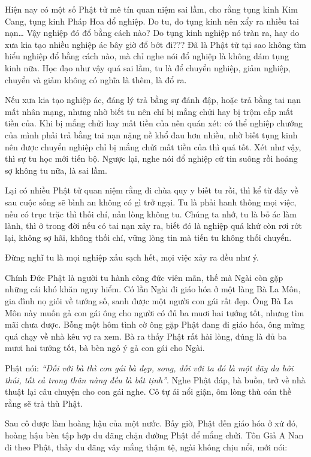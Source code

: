 \documentclass[
  12pt,
  oneside]{book}
\begin{document}
Hiện nay có một số Phật tử mê tín quan niệm sai lầm, cho rằng tụng kinh Kim Cang, tụng kinh Pháp Hoa đổ nghiệp. Do tu, do tụng kinh nên xẩy ra nhiều tai nạn\ldots{} Vậy nghiệp đó đổ bằng cách nào? Do tụng kinh nghiệp nó tràn ra, hay do xưa kia tạo nhiều nghiệp ác bây giờ đổ bớt đi??? Đã là Phật tử tại sao không tìm hiểu nghiệp đổ bằng cách nào, mà chỉ nghe nói đổ nghiệp là không dám tụng kinh nữa. Học đạo như vậy quá sai lầm, tu là để chuyển nghiệp, giảm nghiệp, chuyển và giảm không có nghĩa là thêm, là đổ ra.

Nếu xưa kia tạo nghiệp ác, đáng lý trả bằng sự đánh đập, hoặc trả bằng tai nạn mất nhân mạng, nhưng nhờ biết tu nên chỉ bị mắng chửi hay bị trộm cắp mất tiền của. Khi bị mắng chửi hay mất tiền của nên quán xét: có thể nghiệp chướng của mình phải trả bằng tai nạn nặng nề khổ đau hơn nhiều, nhờ biết tụng kinh nên được chuyển nghiệp chỉ bị mắng chửi mất tiền của thì quá tốt. Xét như vậy, thì sự tu học mới tiến bộ. Ngược lại, nghe nói đổ nghiệp cứ tin suông rồi hoảng sợ không tu nữa, là sai lầm.

Lại có nhiều Phật tử quan niệm rằng đi chùa quy y biết tu rồi, thì kể từ đây về sau cuộc sống sẽ bình an không có gì trở ngại. Tu là phải hanh thông mọi việc, nếu có trục trặc thì thối chí, nản lòng không tu. Chúng ta nhớ, tu là bỏ ác làm lành, thì ở trong đời nếu có tai nạn xảy ra, biết đó là nghiệp quá khứ còn rơi rớt lại, không sợ hãi, không thối chí, vững lòng tin mà tiến tu không thối chuyển.

Đừng nghĩ tu là mọi nghiệp xấu sạch hết, mọi việc xảy ra đều như ý.

Chính Đức Phật là người tu hành công đức viên mãn, thế mà Ngài còn gặp những cái khó khăn nguy hiểm. Có lần Ngài đi giáo hóa ở một làng Bà La Môn, gia đình nọ giỏi về tướng số, sanh được một người con gái rất đẹp. Ông Bà La Môn này muốn gả con gái ông cho người có đủ ba muơi hai tướng tốt, nhưng tìm mãi chưa được. Bỗng một hôm tình cờ ông gặp Phật đang đi giáo hóa, ông mừng quá chạy về nhà kêu vợ ra xem. Bà ra thấy Phật rất hài lòng, đúng là đủ ba mươi hai tướng tốt, bà bèn ngỏ ý gả con gái cho Ngài.

Phật nói: \emph{``Đối với bà thì con gái bà đẹp, song, đối với ta đó là một dãy da hôi thúi, tất cả trong thân nàng đều là bất tịnh''}. Nghe Phật đáp, bà buồn, trở về nhà thuật lại câu chuyện cho con gái nghe. Cô tự ái nổi giận, ôm lòng thù oán thề rằng sẽ trả thù Phật.

Sau cô được làm hoàng hậu của một nước. Bấy giờ, Phật đến giáo hóa ở xứ đó, hoàng hậu bèn tập hợp du đãng chặn đường Phật để mắng chửi. Tôn Giả A Nan đi theo Phật, thấy du đãng vây mắng thậm tệ, ngài không chịu nổi, mới nói:
\end{document}
